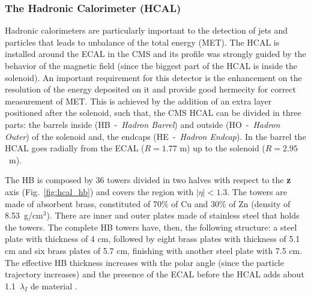 \subsubsection{The Hadronic Calorimeter (HCAL)}
Hadronic calorimeters are particularly important to the detection of jets and particles that leads to unbalance of the total energy (MET). The HCAL is installed around the ECAL in the CMS and its profile was strongly guided by the behavior of the magnetic field (since the biggest part of the HCAL is inside the solenoid). An important requirement for this detector is the enhancement on the resolution of the energy deposited on it and provide good hermecity for correct measurement of MET. This is achieved by the addition of an extra layer positioned after the solenoid, such that, the CMS HCAL can be divided in three parts: the barrels inside (HB~-~\textit{Hadron Barrel}) and outside (HO~-~\textit{Hadron Outer}) of the solenoid and, the endcaps (HE~-~\textit{Hadron Endcap}). In the barrel the HCAL goes radially from the ECAL ($R = 1.77$ m) up to the solenoid ($R = 2.95$~m).

The HB is composed by 36 towers divided in two halves with respect to the \textbf{z} axis (Fig.~\ref{fig:hcal_hb}) and covers the region with $|\eta|<1.3$. The towers are made of absorbent brass, constituted of 70$\%$ of Cu and 30$\%$ of Zn (density of 8.53~g/cm$^{3}$). There are inner and outer plates made of stainless steel that holds the towers. The complete HB towers have, then, the following structure: a steel plate with thickness of 4 cm, followed by eight brass plates with thickness of 5.1 cm and six brass plates of 5.7 cm, finishing with another steel plate with 7.5 cm. The effective HB thickness increases with the polar angle (since the particle trajectory increases) and the presence of the ECAL before the HCAL adds about 1.1~$\lambda_I$ de material \cite{bib:JINST-3-362-2008,bib:CMS-PTDR-2006}.

